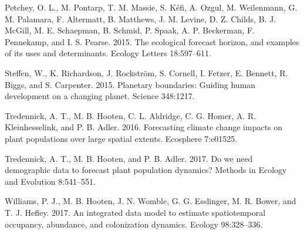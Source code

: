 \documentclass[12pt,]{article}
\begin{document}
\hypertarget{ref-Petchey2015}{}
Petchey, O. L., M. Pontarp, T. M. Massie, S. Kéfi, A. Ozgul, M.
Weilenmann, G. M. Palamara, F. Altermatt, B. Matthews, J. M. Levine, D.
Z. Childs, B. J. McGill, M. E. Schaepman, B. Schmid, P. Spaak, A. P.
Beckerman, F. Pennekamp, and I. S. Pearse. 2015. The ecological forecast
horizon, and examples of its uses and determinants. Ecology Letters
18:597--611.

\hypertarget{ref-Steffen2015}{}
Steffen, W., K. Richardson, J. Rockström, S. Cornell, I. Fetzer, E.
Bennett, R. Biggs, and S. Carpenter. 2015. Planetary boundaries: Guiding
human development on a changing planet. Science 348:1217.

\hypertarget{ref-Tredennick2016Ecos}{}
Tredennick, A. T., M. B. Hooten, C. L. Aldridge, C. G. Homer, A. R.
Kleinhesselink, and P. B. Adler. 2016. Forecasting climate change
impacts on plant populations over large spatial extents. Ecosphere
7:e01525.

\hypertarget{ref-Tredennick2017a}{}
Tredennick, A. T., M. B. Hooten, and P. B. Adler. 2017. Do we need
demographic data to forecast plant population dynamics? Methods in
Ecology and Evolution 8:541--551.

\hypertarget{ref-Williams2017a}{}
Williams, P. J., M. B. Hooten, J. N. Womble, G. G. Esslinger, M. R.
Bower, and T. J. Hefley. 2017. An integrated data model to estimate
spatiotemporal occupancy, abundance, and colonization dynamics. Ecology
98:328--336.
\end{document}
